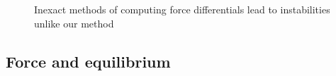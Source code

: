 \begin{figure}[b!]
\caption{Inexact methods of computing force differentials lead to instabilities
unlike our method}
\label{fig:warpedstiff}
\end{figure}

\subsection{Force and equilibrium}
\label{sec:force}

